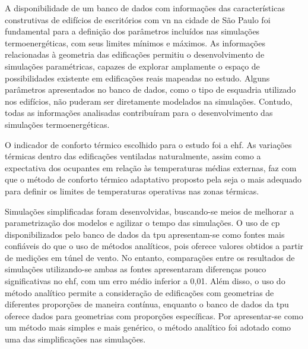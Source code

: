 \documentclass[brazil,hardcopy,openany]{ufscthesis} %
\begin{document}
	A disponibilidade de um banco de dados com informações das características construtivas de edifícios de escritórios com \acrfull{vn} na cidade de São Paulo foi fundamental para a definição dos parâmetros incluídos nas simulações termoenergéticas, com seus limites mínimos e máximos. 
	As informações relacionadas à geometria das edificações permitiu o desenvolvimento de simulações paramétricas, capazes de explorar amplamente o espaço de possibilidades existente em edificações reais mapeadas no estudo.
	Alguns parâmetros apresentados no banco de dados, como o tipo de esquadria utilizado nos edifícios, não puderam ser diretamente modelados na simulações. Contudo, todas as informações analisadas contribuíram para o desenvolvimento das simulações termoenergéticas.
	
	O indicador de conforto térmico escolhido para o estudo foi a \acrfull{ehf}. As variações térmicas dentro das edificações ventiladas naturalmente, assim como a expectativa dos ocupantes em relação às temperaturas médias externas, faz com que o método de conforto térmico adaptativo proposto pela  seja o mais adequado para definir os limites de temperaturas operativas nas zonas térmicas.
	
	Simulações simplificadas foram desenvolvidas, buscando-se meios de melhorar a parametrização dos modelos e agilizar o tempo das simulações.	
	O uso de \acrfull{cp} disponibilizados pelo banco de dados da \acrfull{tpu} apresentam-se como fontes mais confiáveis do que o uso de métodos analíticos, pois oferece valores obtidos a partir de medições em túnel de vento. No entanto, comparações entre os resultados de simulações utilizando-se ambas as fontes apresentaram diferenças pouco significativas no \acrshort{ehf}, com um erro médio inferior a 0,01.
	Além disso, o uso do método analítico permite a consideração de edificações com geometrias de diferentes proporções de maneira contínua, enquanto o banco de dados da \acrshort{tpu} oferece dados para geometrias com proporções específicas.
	Por apresentar-se como um método mais simples e mais genérico, o método analítico foi adotado como uma das simplificações nas simulações.
	
\end{document}
